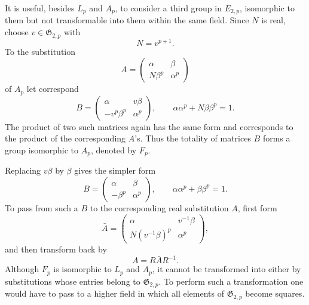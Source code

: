 \documentclass[11pt,a4paper]{article}
\begin{document}
It is useful, besides \(L_p\) and \(A_p\), to consider a third group in \(E_{2,p}\), isomorphic to them but not transformable into them within the same field.  Since \(N\) is real, choose \(v\in\mathfrak G_{2,p}\) with
\[
 N=v^{p+1}.
\]
To the substitution
\[
 A=\begin{pmatrix}\alpha&\beta\\N\beta^p&\alpha^p\end{pmatrix}
\]
of \(A_p\) let correspond
\begin{equation}\label{eq:69-13}
 B=\begin{pmatrix}\alpha&v\beta\\-v^p\beta^p&\alpha^p\end{pmatrix},
 \qquad \alpha\alpha^p+N\beta\beta^p=1.
\end{equation}
The product of two such matrices again has the same form and corresponds to the product of the corresponding \(A\)'s.  Thus the totality of matrices \(B\) forms a group isomorphic to \(A_p\), denoted by \(F_p\).

Replacing \(v\beta\) by \(\beta\) gives the simpler form
\begin{equation}\label{eq:69-14}
 B=\begin{pmatrix}\alpha&\beta\\-\beta^p&\alpha^p\end{pmatrix},
 \qquad \alpha\alpha^p+\beta\beta^p=1.
\end{equation}
To pass from such a \(B\) to the corresponding real substitution \(A\), first form
\begin{equation}\label{eq:69-15}
 \bar A=\begin{pmatrix}\alpha&v^{-1}\beta\\N(v^{-1}\beta)^p&\alpha^p\end{pmatrix},
\end{equation}
and then transform back by
\begin{equation}\label{eq:69-16}
 A=R\bar A R^{-1}.
\end{equation}
Although \(F_p\) is isomorphic to \(L_p\) and \(A_p\), it cannot be transformed into either by substitutions whose entries belong to \(\mathfrak G_{2,p}\).  To perform such a transformation one would have to pass to a higher field in which all elements of \(\mathfrak G_{2,p}\) become squares.
\end{document}
